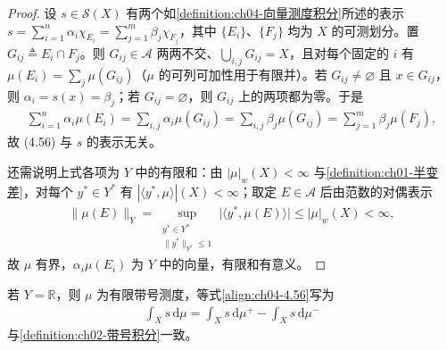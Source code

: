 \documentclass[../../main.tex]{subfiles}%
\begin{document}
\begin{proof}
设 $s\in\mathcal{S}(X)$ 有两个如\cref{definition:ch04-向量测度积分}所述的表示 $s=\sum_{i=1}^n\alpha_i\chi_{E_i}=\sum_{j=1}^m\beta_j\chi_{F_j}$，其中 $\{E_i\}$、$\{F_j\}$ 均为 $X$ 的可测划分。置 $G_{ij}\triangleq E_i\cap F_j$。则 $G_{ij}\in\mathcal{A}$ 两两不交、$\bigcup_{i,j}G_{ij}=X$，且对每个固定的 $i$ 有 $\mu(E_i)=\sum_j\mu(G_{ij})$（$\mu$ 的可列可加性用于有限并）。若 $G_{ij}\neq\varnothing$ 且 $x\in G_{ij}$，则 $\alpha_i=s(x)=\beta_j$；若 $G_{ij}=\varnothing$，则 $G_{ij}$ 上的两项都为零。于是
\begin{align*}
\sum_{i=1}^n\alpha_i\mu(E_i)=\sum_{i,j}\alpha_i\mu(G_{ij})=\sum_{i,j}\beta_j\mu(G_{ij})=\sum_{j=1}^m\beta_j\mu(F_j),
\end{align*}
故 (4.56) 与 $s$ 的表示无关。

还需说明上式各项为 $Y$ 中的有限和：由 $|\mu|_w(X)<\infty$ 与\cref{definition:ch01-半变差}，对每个 $y^*\in Y^*$ 有 $|\langle y^*,\mu\rangle|(X)<\infty$；取定 $E\in\mathcal{A}$ 后由范数的对偶表示
\begin{align*}
\|\mu(E)\|_Y=\sup_{\substack{y^*\in Y^*\\\|y^*\|_{Y^*}\leqslant1}}\big|\langle y^*,\mu(E)\rangle\big|\leqslant|\mu|_w(X)<\infty,
\end{align*}
故 $\mu$ 有界，$\alpha_i\mu(E_i)$ 为 $Y$ 中的向量，有限和有意义。
\end{proof}

\begin{remark}\label{remark:ch04-向量测度积分标量}
若 $Y=\mathbb{R}$，则 $\mu$ 为有限带号测度，等式\eqref{align:ch04-4.56}写为
\begin{align}
\int_X s\,\mathrm{d}\mu=\int_X s\,\mathrm{d}\mu^+-\int_X s\,\mathrm{d}\mu^- \label{align:ch04-4.57}
\end{align}
与\cref{definition:ch02-带号积分}一致。
\end{remark}
\end{document}
